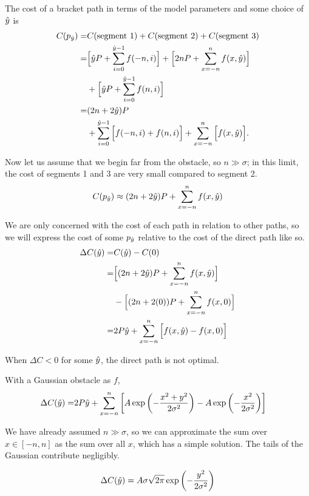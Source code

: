 The cost of a bracket path in terms of the model parameters and some choice of $\hat{y}$ is 
\begin{align*}
C(p_{\hat{y}}) =& C(\text{segment 1}) + C(\text{segment 2}) + C(\text{segment 3}) \\
=&\Big[\hat{y} P + \sum\limits_{i=0}^{\hat{y}-1} f(-n, i) \Big] +
         \Big[2nP + \sum\limits_{x=-n}^{n}    f(x,\hat{y}) \Big]\\
     &+\Big[\hat{y} P + \sum\limits_{i=0}^{\hat{y}-1} f(n, i) \Big] \\
=&(2n+2\hat{y})P \\ &+\sum\limits_{i=0}^{\hat{y}-1} \Big[ f(-n, i) + f(n, i) \Big] + \sum\limits_{x=-n}^{n} \Big[f(x,\hat{y}) \Big].
\end{align*}

Now let us assume that we begin far from the obstacle, so $n \gg \sigma$; in this limit, the cost of segments 1 and 3 are very small compared to segment 2.
\begin{equation}
C(p_{\hat{y}}) \approx (2n+2\hat{y})P +  \sum\limits_{x=-n}^{n} f(x,\hat{y})
\end{equation}

We are only concerned with the cost of each path in relation to other paths, so we will express the cost of some $p_{\hat{y}}$ relative to the cost of the direct path like so. 
\begin{align*}
\Delta C(\hat{y}) =& C(\hat{y})-C(0) \\
=& \Big[(2n+2\hat{y})P +  \sum\limits_{x=-n}^{n} f(x,\hat{y}) \Big] \\
 & - \Big[(2n+2(0))P +  \sum\limits_{x=-n}^{n} f(x,0) \Big] \\
=& 2P\hat{y} + \sum\limits_{x=-n}^{n} \Big[ f(x,\hat{y})-f(x,0) \Big]
\end{align*}

When $\Delta C < 0$ for some $\hat{y}$, the direct path is not optimal.

With a Gaussian obstacle as $f$,
\begin{align*}
\Delta C(\hat{y}) =& 2P\hat{y} + \sum\limits_{x=-n}^{n} \left[A\exp\left(-\frac{x^2 + y^2}{2\sigma^2}\right) - A\exp\left(-\frac{x^2}{2\sigma^2}\right) \right]
\end{align*}

We have already assumed $n \gg \sigma$, so we can approximate the sum over $x \in [-n, n]$ as the sum over all $x$, which has a simple solution. The tails of the Gaussian contribute negligibly.

\begin{equation}
\Delta C(\hat{y}) = A\sigma\sqrt{2\pi}\exp\left(-\frac{y^2}{2\sigma^2}\right)
\end{equation}

